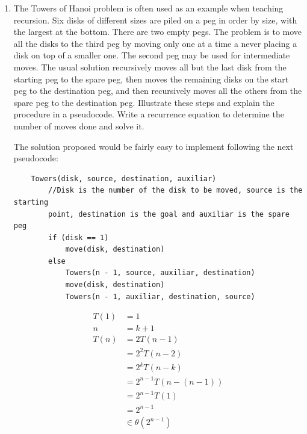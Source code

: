 \documentclass{article}
\begin{document}
\begin{enumerate}
    \item The Towers of Hanoi problem is often used as an example when teaching recursion. Six disks of different sizes are piled on a peg in order by size, with the largest at the bottom. There are two empty pegs. The problem is to move all the disks to the third peg by moving only one at a time a never placing a disk on top of a smaller one. The second peg may be used for intermediate moves. The usual solution recursively moves all but the last disk from the starting peg to the spare peg, then moves the remaining disks on the start peg to the destination peg, and then recursively moves all the others from the spare peg to the destination peg. Illustrate these steps and explain the procedure in a pseudocode. Write a recurrence equation to determine the number of moves done and solve it.

    The solution proposed would be fairly easy to implement following the next pseudocode:
    \begin{lstlisting}
    Towers(disk, source, destination, auxiliar)
        //Disk is the number of the disk to be moved, source is the starting
        point, destination is the goal and auxiliar is the spare peg
        if (disk == 1)
            move(disk, destination)
        else
            Towers(n - 1, source, auxiliar, destination)
            move(disk, destination)
            Towers(n - 1, auxiliar, destination, source)
    \end{lstlisting}

    \begin{align*}
        T(1) &= 1\\
        n &= k +1\\
        T(n) &= 2T(n-1)\\
        &= 2^2T(n-2)\\
        &= 2^kT(n-k)\\
        &= 2^{n-1}T(n-(n -1))\\
        &= 2^{n-1}T(1)\\
        &= 2^{n-1}\\
        &\in \theta(2^{n-1})
    \end{align*}

\end{enumerate}
\end{document}
